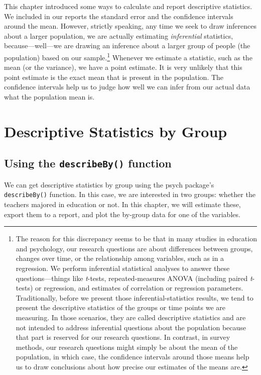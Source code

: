 \documentclass[
]{article}
\begin{document}
This chapter introduced some ways to calculate and report descriptive statistics. We included in our reports the standard error and the confidence intervals around the mean. However, strictly speaking, any time we seek to draw inferences about a larger population, we are actually estimating \emph{inferential} statistics, because---well---we are drawing an inference about a larger group of people (the population) based on our sample.\footnote{The reason for this discrepancy seems to be that in many studies in education and psychology, our research questions are about differences between groups, changes over time, or the relationship among variables, such as in a regression. We perform inferential statistical analyses to answer these questions---things like \emph{t}-tests, repeated-measures ANOVA (including paired \emph{t}-tests) or regression, and estimates of correlation or regression parameters. Traditionally, before we present those inferential-statistics results, we tend to present the descriptive statistics of the groups or time points we are measuring. In those scenarios, they are called descriptive statistics and are not intended to address inferential questions about the population because that part is reserved for our research questions. In contrast, in survey methods, our research questions might simply be about the mean of the population, in which case, the confidence intervals around those means help us to draw conclusions about how precise our estimates of the means are.} Whenever we estimate a statistic, such as the mean (or the variance), we have a point estimate. It is very unlikely that this point estimate is the exact mean that is present in the population. The confidence intervals help us to judge how well we can infer from our actual data what the population mean is.

\hypertarget{ByDescripts}{%
\section{Descriptive Statistics by Group}\label{ByDescripts}}

\hypertarget{using-the-describeby-function}{%
\subsection{\texorpdfstring{Using the \texttt{describeBy()} function}{Using the describeBy() function}}\label{using-the-describeby-function}}

We can get descriptive statistics by group using the psych package's \texttt{describeBy()} function. In this case, we are interested in two groups: whether the teachers majored in education or not. In this chapter, we will estimate these, export them to a report, and plot the by-group data for one of the variables.
\end{document}
